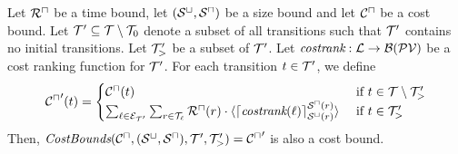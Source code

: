 \begin{theorem}
  Let ${\mathcal{R}^\sqcap}$ be a time bound, let ${({\mathcal{S}^\sqcup}, {\mathcal{S}^\sqcap})}$ be a size bound and let ${\mathcal{C}^\sqcap}$ be a cost bound.
  Let $\mathcal{T}' \subseteq \mathcal{T} \setminus \mathcal{T}_0$ denote a subset of all transitions such that $\mathcal{T}'$ contains no initial transitions.
  Let $\mathcal{T}'_>$ be a subset of $\mathcal{T}'$.
  Let $\emph{costrank}: \mathcal{L} \rightarrow \mathcal{B}(\mathcal{PV})$ be a cost ranking function for $\mathcal{T}'$.
  For each transition $t \in \mathcal{T}'$, we define
  \[ {\mathcal{C}^\sqcap}'(t) = 
  \begin{cases}
    {\mathcal{C}^\sqcap}(t) & \text{ if } t \in \mathcal{T} \setminus \mathcal{T}'_> \\
    \sum_{\ell \in \mathcal{E}_{\mathcal{T}'}} \sum_{r \in \mathcal{T}_\ell} {\mathcal{R}^\sqcap}(r) \cdot \langle\lceil \emph{costrank}(\ell) \rceil^{{\mathcal{S}^\sqcap}(r)}_{{\mathcal{S}^\sqcup}(r)}\rangle & \text{ if } t \in \mathcal{T}'_>
  \end{cases}
  \]
  Then, $\emph{CostBounds}({\mathcal{C}^\sqcap}, {({\mathcal{S}^\sqcup}, {\mathcal{S}^\sqcap})}, \mathcal{T}', \mathcal{T}'_>) = {\mathcal{C}^\sqcap}'$ is also a cost bound.
\end{theorem}
